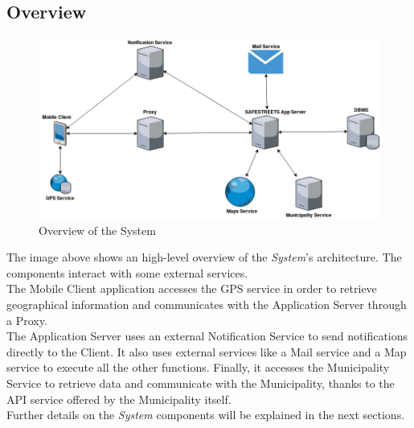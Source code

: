 \documentclass{article}
\begin{document}
	\subsection{Overview}
		\begin{figure}[H]
			\centering
			\includegraphics[scale=0.35]{Images/Diagrams/overview_diagram.png}
			\caption{Overview of the System}
		\end{figure}
	The image above shows an high-level overview of the {\it System}'s architecture.
	The components interact with some external services. \\
	The Mobile Client application accesses the GPS service in order to retrieve geographical information and communicates with the Application Server through a Proxy. \\ The Application Server uses an external Notification Service to send notifications directly to the Client. It also uses external services like a Mail service and a Map service to execute all the other functions. Finally, it accesses the Municipality Service to retrieve data and communicate with the Municipality, thanks to the API service offered by the Municipality itself.\\ 
	Further details on the {\it System} components will be explained in the next sections. 		
	\pagebreak	
	
\end{document}
